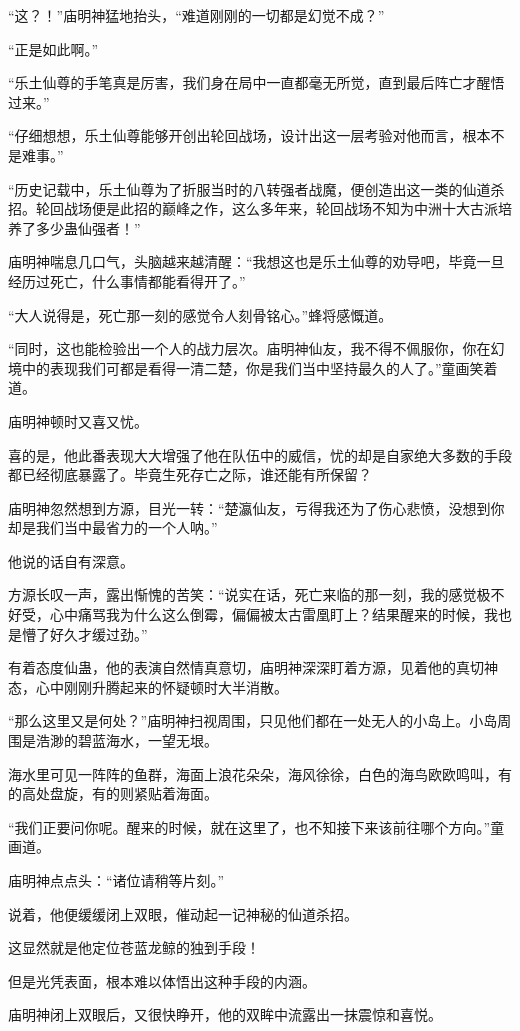 \begin{this_body}
“这？！”庙明神猛地抬头，“难道刚刚的一切都是幻觉不成？”

“正是如此啊。”

“乐土仙尊的手笔真是厉害，我们身在局中一直都毫无所觉，直到最后阵亡才醒悟过来。”

“仔细想想，乐土仙尊能够开创出轮回战场，设计出这一层考验对他而言，根本不是难事。”

“历史记载中，乐土仙尊为了折服当时的八转强者战魔，便创造出这一类的仙道杀招。轮回战场便是此招的巅峰之作，这么多年来，轮回战场不知为中洲十大古派培养了多少蛊仙强者！”

庙明神喘息几口气，头脑越来越清醒：“我想这也是乐土仙尊的劝导吧，毕竟一旦经历过死亡，什么事情都能看得开了。”

“大人说得是，死亡那一刻的感觉令人刻骨铭心。”蜂将感慨道。

“同时，这也能检验出一个人的战力层次。庙明神仙友，我不得不佩服你，你在幻境中的表现我们可都是看得一清二楚，你是我们当中坚持最久的人了。”童画笑着道。

庙明神顿时又喜又忧。

喜的是，他此番表现大大增强了他在队伍中的威信，忧的却是自家绝大多数的手段都已经彻底暴露了。毕竟生死存亡之际，谁还能有所保留？

庙明神忽然想到方源，目光一转：“楚瀛仙友，亏得我还为了伤心悲愤，没想到你却是我们当中最省力的一个人呐。”

他说的话自有深意。

方源长叹一声，露出惭愧的苦笑：“说实在话，死亡来临的那一刻，我的感觉极不好受，心中痛骂我为什么这么倒霉，偏偏被太古雷凰盯上？结果醒来的时候，我也是懵了好久才缓过劲。”

有着态度仙蛊，他的表演自然情真意切，庙明神深深盯着方源，见着他的真切神态，心中刚刚升腾起来的怀疑顿时大半消散。

“那么这里又是何处？”庙明神扫视周围，只见他们都在一处无人的小岛上。小岛周围是浩渺的碧蓝海水，一望无垠。

海水里可见一阵阵的鱼群，海面上浪花朵朵，海风徐徐，白色的海鸟欧欧鸣叫，有的高处盘旋，有的则紧贴着海面。

“我们正要问你呢。醒来的时候，就在这里了，也不知接下来该前往哪个方向。”童画道。

庙明神点点头：“诸位请稍等片刻。”

说着，他便缓缓闭上双眼，催动起一记神秘的仙道杀招。

这显然就是他定位苍蓝龙鲸的独到手段！

但是光凭表面，根本难以体悟出这种手段的内涵。

庙明神闭上双眼后，又很快睁开，他的双眸中流露出一抹震惊和喜悦。


\end{this_body}
